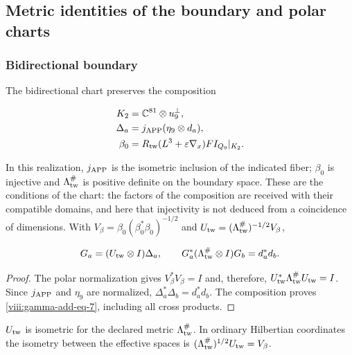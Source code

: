 \subsection{Metric identities of the boundary and polar charts}
\label{viii:gamma-add-sub-195}

\subsubsection{Bidirectional boundary}
\label{viii:gamma-add-sub-197}

The bidirectional chart preserves the composition

\begin{equation}
\begin{aligned}
K_2&=\mathbb C^{81}\otimes u_9^\perp,\\
\Delta_a&=j_{\rm APP}(\eta_9\otimes d_a),\\
\beta_0&=R_{\rm tw}(L^3+\varepsilon\nabla_x)FI_{Q_9}|_{K_2}.
\end{aligned}
\label{viii:gamma-add-display-16}
\end{equation}

In this realization, \(j_{\rm APP}\) is the isometric inclusion
of the indicated fiber; \(\beta_0\) is injective and
\(\Lambda_{\rm tw}^{\#}\) is positive definite on the boundary
space. These are the conditions of the chart: the factors of the
composition are received with their compatible domains, and here that
injectivity is not deduced from a coincidence of dimensions.
With \(V_\beta=\beta_0(\beta_0^*\beta_0)^{-1/2}\) and \(U_{\rm tw}=(\Lambda_{\rm tw}^{\#})^{-1/2}V_\beta\),

\begin{equation}
G_a=(U_{\rm tw}\otimes I)\Delta_a,\qquad
G_a^*(\Lambda_{\rm tw}^{\#}\otimes I)G_b=d_a^*d_b.
\label{viii:gamma-add-eq-7}
\end{equation}

\begin{proof}
The polar normalization gives \(V_\beta^*V_\beta=I\) and, therefore,
\(U_{\rm tw}^*\Lambda_{\rm tw}^{\#}U_{\rm tw}=I\).
Since \(j_{\rm APP}\) and \(\eta_9\) are normalized,
\(\Delta_a^*\Delta_b=d_a^*d_b\). The composition proves
\eqref{viii:gamma-add-eq-7}, including all cross products.
\end{proof}
\(U_{\rm tw}\) is isometric for the declared metric
\(\Lambda_{\rm tw}^{\#}\). In ordinary Hilbertian coordinates
the isometry between the effective spaces is
\((\Lambda_{\rm tw}^{\#})^{1/2}U_{\rm tw}=V_\beta\).

